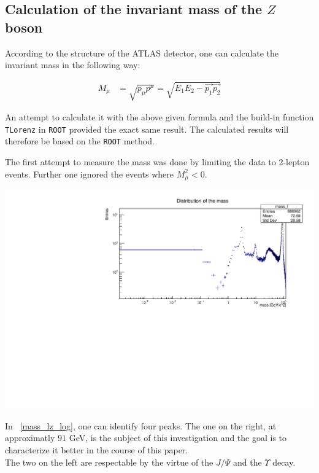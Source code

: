 \documentclass[12pt, a4paper, bibliography=totoc]{scrartcl}
\begin{document}
\begin{multicols}{2}
\begin{center}
\end{center}


\subsection{Calculation of the invariant mass of the $Z$ boson}
According to the structure of the ATLAS detector, one can calculate the invariant mass in the following way:

\begin{align}
	M_{\mu} &= \sqrt{p_{\mu}p^{\mu}} = \sqrt{E_{1}E_{2}-\vec{p_{1}}\vec{p_{2}}}%
\end{align}


An attempt to calculate it with the above given formula and the build-in function \verb*+TLorenz+ in \verb*+ROOT+ provided the exact same result. 
The calculated results will therefore be based on the \verb*+ROOT+ method.


The first attempt to measure the mass was done by limiting the data to 2-lepton events. 
Further one ignored the events where $M_{\mu}^{2} < 0$. 
\begin{center}
	\includegraphics[width=\linewidth]{fig/mass_lz_log.pdf}
	\label{mass_lz_log}
\end{center}

In ~\ref{mass_lz_log}, one can identify four peaks. 
The one on the right, at approximatly $91$ \si{GeV}, is the subject of this investigation and the goal is to characterize it better in the course of this paper.\\
The two on the left are respectable by the virtue of the $J/{\Psi}$ and the $\Upsilon$ decay. 


\end{multicols}
\end{document}
